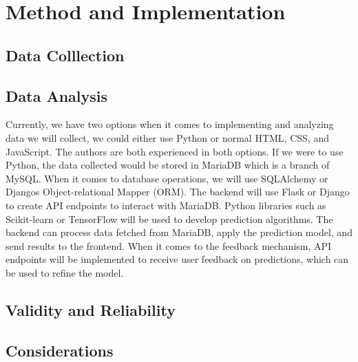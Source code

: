 \chapter{Method and Implementation}

\section{Data Colllection}

\section{Data Analysis}
Currently, we have two options when it comes to implementing and analyzing data we will collect, we could either use Python or normal HTML, CSS, and JavaScript. The authors are both experienced in both options. 
If we were to use Python, the data collected would be stored in MariaDB which is a branch of MySQL. When it comes to database operations, we will use SQLAlchemy or Djangos Object-relational Mapper (ORM). The backend will use Flask or Django to create API endpoints to interact with MariaDB.
Python libraries such as Scikit-learn or TensorFlow will be used to develop prediction algorithms. The backend can process data fetched from MariaDB, apply the prediction model, and send results to the frontend.
When it comes to the feedback mechanism, API endpoints will be implemented to receive user feedback on predictions, which can be used to refine the model.



\section{Validity and Reliability}

\section{Considerations}